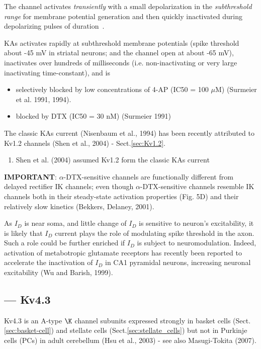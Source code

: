 The channel activates {\it transiently} with a small depolarization in the {\it
subthreshold range} for membrane potential generation  and then quickly
inactivated during depolarizing pulses of duration~\citep{connor1971prf}.

KAs activates rapidly at subthreshold membrane potentials (spike threshold about
-45 mV in striatal neurons; and the channel open at about -65 mV), inactivates
over hundreds of milliseconds (i.e. non-inactivating or very large
inactivating time-constant), and is
\begin{itemize}
  
  \item selectively blocked by low concentrations of 4-AP (IC50 = 100 $\mu$M)
  (Surmeier et al. 1991, 1994).
  
  \item blocked by DTX (IC50 = 30 nM) (Surmeier 1991)
\end{itemize}

The classic KAs current (Nisenbaum et al., 1994) has been recently attributed to
Kv1.2 channels (Shen et al., 2004) - Sect.\ref{sec:Kv1.2}.

\begin{enumerate}
  \item Shen et al. (2004) assumed Kv1.2 form the classic KAs current
\end{enumerate}

{\bf IMPORTANT}: $\alpha$-DTX-sensitive channels are functionally different from
delayed rectifier IK channels; even though $\alpha$-DTX-sensitive channels
resemble IK channels both in their steady-state activation properties (Fig. 5D)
and their relatively slow kinetics (Bekkers, Delaney, 2001).

As $I_D$ is near soma, and little change of $I_D$ is sensitive to neuron's
excitability, it is likely that $I_D$ current plays the role of modulating spike
threshold in the axon. Such a role could be further enriched if $I_D$ is subject
to neuromodulation. Indeed, activation of metabotropic glutamate receptors has
recently been reported to accelerate the inactivation of $I_D$ in CA1 pyramidal
neurons, increasing neuronal excitability (Wu and Barish, 1999).

\subsection{--- Kv4.3}
\label{sec:Kv4.3-channel}

Kv4.3 is an A-type $\K$ channel subunits expressed strongly in basket cells
(Sect.\ref{sec:basket-cell}) and stellate cells (Sect.\ref{sec:stellate_cells})
but not in Purkinje cells (PCs) in adult cerebellum (Hsu et al., 2003) - see
also Masugi-Tokita (2007).


